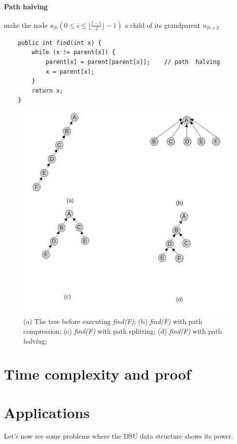 \documentclass{article}
\begin{document}
\paragraph{Path halving} \cite{van1977alternative} \cite{van1980datastructures} make the node $u_{2i} ( 0 \leq i \leq \lfloor \frac{l-1}{2}\rfloor - 1)$ a child 
of its grandparent $u_{2i+2}$
\begin{lstlisting}
    public int find(int x) {
        while (x != parent[x]) {
            parent[x] = parent[parent[x]];    // path  halving
            x = parent[x];
        }
        return x;
    }
\end{lstlisting}
\begin{figure}
    \includegraphics[width = \linewidth]{img/pc.jpg}
    \caption{(a) The tree before executing \emph{find(F)};
    (b) \emph{find(F)} with path compression;
    (c) \emph{find(F)} with path splitting;
    (d) \emph{find(F)} with path halving;
    }
    \label{fig:pc}   
\end{figure}
\section{Time complexity and proof}
\section{Applications}
Let's now see some problems where the DSU data structure shows its power.
\end{document}

